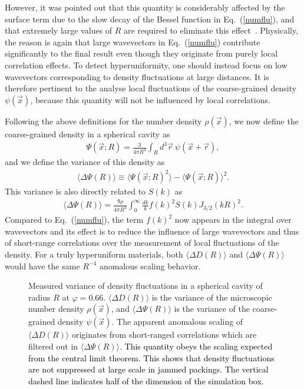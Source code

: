 \documentclass[aps,pre,twocolumn,superscriptaddress]{revtex4-1}
\newcommand{\red}[1]{\textcolor{black}{#1}}
\newcommand{\ave}[1]{\langle {#1} \rangle}
\begin{document}
However, it was pointed out that this quantity 
is considerably affected by the surface term 
due to the slow decay of the Bessel function in Eq.~(\ref{numflu}), 
and that extremely large values of $R$ are required to 
eliminate this effect~\cite{wu2015}. Physically, the reason 
is again that large wavevectors in Eq.~(\ref{numflu}) contribute significantly 
to the final result even though they originate from purely local
correlation effects. To detect hyperuniformity, one
should instead focus on low wavevectors corresponding to 
density fluctuations at large distances. It is therefore pertinent to
the analyse local fluctuations of the coarse-grained density 
$\psi(\vec{x})$, because this quantity
will not be influenced by local correlations.

Following the above definitions for the number density $\rho(\vec{x})$,
we now define the coarse-grained density in a spherical cavity as
\begin{eqnarray}
\Psi (\vec{x};R) = \frac{3}{4 \pi R^3} \int_R d^3\vec{r} \ 
\psi(\vec{x} + \vec{r}), 
\end{eqnarray}
and we define the variance of this density as
\begin{eqnarray}
\ave{\Delta \Psi (R)} \equiv \ave{\Psi  (\vec{x};R)^2} - 
\ave{\Psi  (\vec{x};R)}^2. 
\end{eqnarray}
This variance is also directly related to $S(k)$ as 
\begin{eqnarray}
\ave{\Delta \Psi (R)} = \frac{9\rho}{4 \pi R^3} \int^{\infty}_0 
\frac{dk}{k}  f(k)^2 S(k) J_{3/2} (kR)^2.  \label{psiflu}
\end{eqnarray}
Compared to Eq.~(\ref{numflu}), 
the term $f(k)^2$ now appears in the integral 
over wavevectors and its effect is to reduce the influence 
of large wavevectors and thus of short-range correlations
over the measurement of local fluctuations of the density. 
For a truly hyperuniform materials, both 
$\ave{\Delta D(R)} $ and $\ave{\Delta \Psi (R)}$
would have the same $R^{-4}$ anomalous scaling behavior. 

\begin{figure}
\begin{center}
\caption{Measured variance of density fluctuations in a spherical 
cavity of radius $R$ at $\varphi=0.66$. 
$\ave{\Delta D(R)} $ is the variance of the microscopic 
number density $\rho(\vec{x})$, 
and $\ave{\Delta \Psi(R)} $ is the variance 
of the coarse-grained density $\psi(\vec{x})$. 
The apparent anomalous scaling of $\ave{\Delta D(R)}$
originates from short-ranged correlations which are filtered
out in $\ave{\Delta \Psi(R)}$. \red{This quantity 
obeys the scaling expected from
the central limit theorem. This shows that density 
fluctuations are not suppressed at large scale in jammed packings. 
The vertical dashed line indicates 
half of the dimension of the simulation box. }}
\label{fig:delta}
\end{center}
\end{figure}
\end{document}
